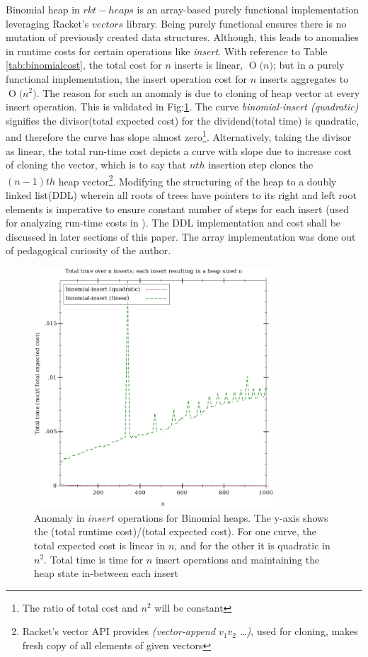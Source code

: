 \documentclass{llncs}
\newcommand{\BigO}[1]{\ensuremath{\operatorname{O}\bigl(#1\bigr)}}
\begin{document}
Binomial heap in $rkt-heaps$ is an array-based purely functional implementation leveraging Racket's $vectors$ library. Being purely functional ensures there is no mutation of previously created data structures. Although, this leads to anomalies in runtime costs for certain operations like \emph{insert}. With reference to Table \ref{tab:binomialcost}, the total cost for $n$ inserts is linear, \BigO{n}; but in a purely functional implementation, the insert operation cost for $n$ inserts aggregates to \BigO{n^2}. The reason for such an anomaly is due to cloning of heap vector at every insert operation. This is validated in Fig:\ref{fig:bino_anomaly}. The curve \emph{binomial-insert (quadratic)} signifies the divisor(total expected cost) for the dividend(total time) is quadratic, and therefore the curve has slope almost zero\footnote{The ratio of total cost and $n^2$ will be constant}. Alternatively, taking the divisor as linear, the total run-time cost depicts a curve with slope due to increase cost of cloning the vector, which is to say that $nth$ insertion step clones the $(n-1)th$ heap vector\footnote{Racket's vector API provides \emph{(vector-append $v_1 v_2$ \dots)}, used for cloning, makes fresh copy of all elements of given vectors}. Modifying the structuring of the heap to a doubly linked list(DDL) wherein all roots of trees have pointers to its right and left root elements is imperative to ensure constant number of steps for each insert (used for analyzing run-time costs in \cite{kozen1992design}). The DDL implementation and cost shall be discussed in later sections of this paper. The array implementation was done out of pedagogical curiosity of the author.

\begin{figure}
	\begin{center}
		\includegraphics[width=0.8\textwidth]{FIG/insert_binomial.pdf}
	\end{center}
	\caption{Anomaly in $insert$ operations for Binomial heaps. The y-axis shows the (total runtime cost)/(total expected cost). For one curve, the total expected cost is linear in $n$, and for the other it is quadratic in $n^2$. Total time is time for $n$ insert operations and maintaining the heap state in-between each insert}
	\label{fig:bino_anomaly}
\end{figure}
\end{document}
